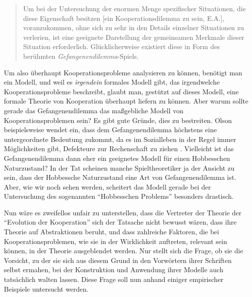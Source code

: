 \documentclass[12pt,a4paper,ngerman]{article}
\begin{document}
\begin{quotation}

Um bei der Untersuchung der enormen Menge spezifischer Situationen, die diese
Eigenschaft besitzen [ein Kooperationsdilemma zu sein, E.A.], voranzukommen,
ohne sich zu sehr in den Details einzelner Situationen zu verlerien, ist eine
geeignete Darstellung der gemeinsamen Merkmale dieser Situation erforderlich.
Glücklicherweise existiert diese in Form des berühmten {\em
Gefangenendilemma}-Spiels. \cite[S. 6/7]{axelrod:1984}

\end{quotation}

Um also überhaupt Kooperationsprobleme analysieren zu können, benötigt
man ein Modell, und weil es {\em irgendein} formales Modell gibt, das
irgendwelche Kooperationsprobleme beschreibt, glaubt man, gestützt auf
dieses Modell, eine formale Theorie von Kooperation überhaupt liefern
zu können. Aber warum sollte gerade das Gefangenendilemma das
maßgebliche Modell von Kooperationsproblemen sein? Es gibt gute
Gründe, dies zu bestreiten. Olson beispielsweise wendet ein, dass dem
Gefangenendilemma höchstens eine untergeordnete Bedeutung zukommt, da
es im Sozialleben in der Regel immer Möglichkeiten gibt, Defekteure
zur Rechenschaft zu ziehen \cite[S. 81-83]{olson:2000}. Vielleicht ist
das Gefangenendilemma dann eher ein geeignetes Modell für einen
Hobbesschen Naturzustand? In der Tat scheinen manche Spieltheoretiker
ja der Ansicht zu sein, dass der Hobbessche Naturzustand eine Art von
Gefangenendilemma ist. Aber, wie wir noch sehen werden, scheitert das
Modell gerade bei der Untersuchung des sogenannten "`Hobbesschen
Problems"' besonders drastisch.

Nun wäre es zweifellos unfair zu unterstellen, dass die Vertreter der
Theorie der "`Evolution der Kooperation"' sich der Tatsache nicht
bewusst wären, dass ihre Theorie auf Abstraktionen beruht, und dass
zahlreiche Faktoren, die bei Kooperationsproblemen, wie sie in der
Wirklichkeit auftreten, relevant sein können, in der Theorie
ausgeblendet werden. Nur stellt sich die Frage, ob sie die Vorsicht,
zu der sie sich aus diesem Grund in den Vorwörtern ihrer Schriften
selbst ermahen, bei der Konstruktion und Anwendung ihrer Modelle auch
tatsächlich walten lassen. Diese Frage soll nun anhand einiger
empirischer Beispiele untersucht werden.
\end{document}
